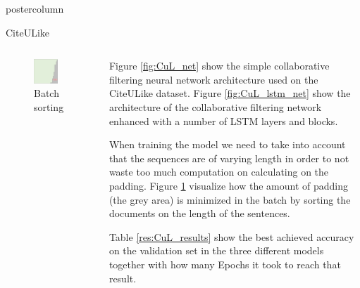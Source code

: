 \documentclass[final,hyperref={pdfpagelabels=false}]{beamer}
\begin{document}
\begin{frame}
\begin{columns}
\begin{column}{.49\paperwidth}
\begin{beamercolorbox}[center,wd=\textwidth]{postercolumn}
\begin{minipage}[T]{.99\textwidth}
{\begin{block}{CiteULike}
\begin{columns}
\begin{column}{1\textwidth}
\begin{minipage}[t]{0.96\textwidth}
\begin{columns}
\begin{column}{0.33\textwidth}
\begin{figure}
\includegraphics[width=0.75\textwidth]{sorted_batch.png}
 \caption{Batch sorting} \label{fig:batch_sorted}
\end{figure}

 \end{column}
 \begin{column}{0.66\textwidth}
	\justifying
 \footnotesize{
	Figure \ref{fig:CuL_net} show the simple collaborative filtering neural network architecture used on the CiteULike dataset. Figure \ref{fig:CuL_lstm_net} show the architecture of the collaborative filtering network enhanced with a number of LSTM layers and blocks.
	
	When training the model we need to take into account that the sequences are of varying length in order to not waste too much computation on calculating on the padding. Figure \ref{fig:batch_sorted} visualize how the amount of padding (the grey area) is minimized in the batch by sorting the documents on the length of the sentences.
	
	Table \ref{res:CuL_results} show the best achieved accuracy on the validation set in the three different models together with how many Epochs it took to reach that result.
	}
 \end{column}
 \end{columns}



\end{minipage}
\end{column}
\end{columns}
\end{block}}
\end{minipage}
\end{beamercolorbox}
\end{column}
\end{columns}
\end{frame}
\end{document}
